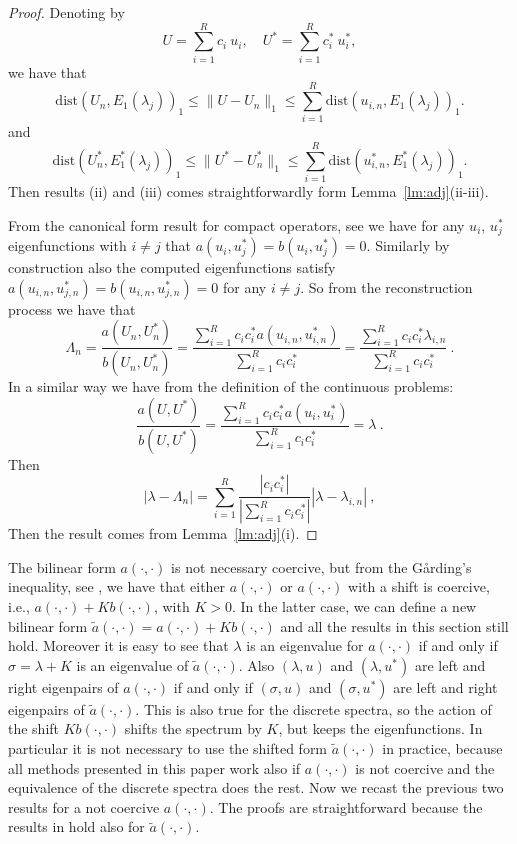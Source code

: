 \documentclass[smallextended]{svjour3}
\begin{document}
\begin{proof}
Denoting by 
$$
U=\sum_{i=1}^{R} c_i \ u_{i},\quad U^*=\sum_{i=1}^{R} c_i^* \ u_{i}^*,
$$
we have that
$$
\mathrm{dist}(
U_n,E_1(\lambda_j))_{1}\leq \|U-U_n\|_{1}\leq \sum_{i=1}^{R} \mathrm{dist}(
u_{i,n},E_1(\lambda_j))_{1}.
$$
and
$$
\mathrm{dist}(
U_n^*,E_1^*(\lambda_j))_{1}\leq \|U^*-U_n^*\|_{1}\leq \sum_{i=1}^{R} \mathrm{dist}(
u_{i,n}^*,E_1^*(\lambda_j))_{1}.
$$
Then results (ii) and (iii) comes straightforwardly form Lemma~\ref{lm:adj}(ii-iii).


From the canonical form result for compact operators, see \cite[Theorem~9.17]{Hislop} we have for any $u_i$, $u_j^*$ eigenfunctions with $i\neq j$ that $a(u_i,u_j^*)=b(u_i,u_j^*)=0$.
Similarly by construction also the computed eigenfunctions satisfy $a(u_{i,n},u_{j,n}^*)=b(u_{i,n},u_{j,n}^*)=0$ for any $i\neq j$.
So from the reconstruction process we have that
$$
\Lambda_n=\frac{a(U_n,U_n^*)}{b(U_n,U_n^*)}=\frac{\sum_{i=1}^{R} c_ic_i^*a(u_{i,n},u_{i,n}^*)}{\sum_{i=1}^{R} c_ic_i^*}
=\frac{\sum_{i=1}^{R} c_ic_i^*\lambda_{i,n}}{\sum_{i=1}^{R} c_ic_i^*}\ .
$$
In a similar way we have from the definition of the continuous problems:
$$
\frac{a(U,U^*)}{b(U,U^*)}=\frac{\sum_{i=1}^{R} c_ic_i^*a(u_{i},u_{i}^*)}{\sum_{i=1}^{R} c_ic_i^*}=\lambda\ .
$$
Then
$$
|\lambda-\Lambda_n|=\sum_{i=1}^{R}\frac{|c_ic_i^*|}{|\sum_{i=1}^{R} c_ic_i^*|}|\lambda-\lambda_{i,n}| \ ,
$$
Then the result comes from Lemma~\ref{lm:adj}(i).



\end{proof}

The bilinear form $a(\cdot,\cdot)$ is not necessary coercive, but from the G\r{a}rding's inequality, see \cite[Theorem~(5.6.8)]{Brenner}, we have that either $a(\cdot,\cdot)$ or $a(\cdot,\cdot)$ with a shift is coercive, i.e., $a(\cdot,\cdot)+K b(\cdot,\cdot)$, with $K>0$. In the latter case, we can define a new bilinear form $\tilde a(\cdot,\cdot)=a(\cdot,\cdot)+K b(\cdot,\cdot)$ and all the results in this section still hold. Moreover it is easy to see that $\lambda$ is an eigenvalue for $a(\cdot,\cdot)$ if and only if $\sigma=\lambda+K$ is an eigenvalue of $\tilde  a(\cdot,\cdot)$. Also $(\lambda,u)$ and $(\lambda,u^*)$ are left and right eigenpairs of $a(\cdot,\cdot)$ if and only if $(\sigma,u)$ and $(\sigma,u^*)$ are left and right eigenpairs of $\tilde  a(\cdot,\cdot)$. This is also true for the discrete spectra, so the action of the shift $K b(\cdot,\cdot)$ shifts the spectrum by $K$, but keeps the eigenfunctions. In particular it is not necessary to use the shifted form $\tilde a(\cdot,\cdot)$ in practice, because all methods presented in this paper work also if $a(\cdot,\cdot)$ is not coercive and the equivalence of the discrete spectra does the rest. Now we recast the previous two results for a not coercive  $a(\cdot,\cdot)$. The proofs are straightforward because the results in \cite{babuska} hold also for $\tilde a(\cdot,\cdot)$.
\end{document}
